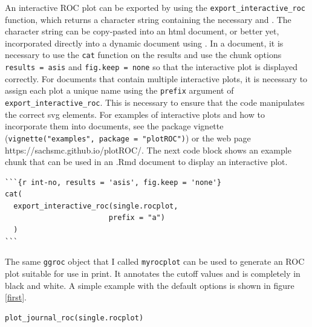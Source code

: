 \documentclass[article]{jss}
\begin{document}
An interactive ROC plot can be exported by using the
\texttt{export\_interactive\_roc} function, which returns a character
string containing the necessary  and
. The character string can be copy-pasted into an
html document, or better yet, incorporated directly into a dynamic
document using  \citep{knitr}. In a  document, it
is necessary to use the \texttt{cat} function on the results and use the
chunk options
\texttt{results = \textquotesingle{}asis\textquotesingle{}} and
\texttt{fig.keep = \textquotesingle{}none\textquotesingle{}} so that the
interactive plot is displayed correctly. For documents that contain
multiple interactive plots, it is necessary to assign each plot a unique
name using the \texttt{prefix} argument of
\texttt{export\_interactive\_roc}. This is necessary to ensure that the
 code manipulates the correct svg elements. For
examples of interactive plots and how to incorporate them into
 documents, see the package vignette
(\texttt{vignette("examples", package = "plotROC")}) or the web page
https://sachsmc.github.io/plotROC/. The next code block shows an example
 chunk that can be used in an .Rmd document to display an
interactive plot.

\begin{verbatim}
```{r int-no, results = 'asis', fig.keep = 'none'}
cat(
  export_interactive_roc(single.rocplot, 
                        prefix = "a")
  )
```
\end{verbatim}

The same \texttt{ggroc} object that I called \texttt{myrocplot} can be
used to generate an ROC plot suitable for use in print. It annotates the
cutoff values and is completely in black and white. A simple example
with the default options is shown in figure \ref{first}.

\begin{verbatim}
plot_journal_roc(single.rocplot)
\end{verbatim}
\end{document}
